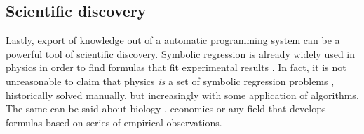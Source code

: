 \subsection{Scientific discovery}
\label{sec:scientific-discovery}

Lastly, export of knowledge out of a automatic programming system can be a powerful tool of scientific discovery. 
Symbolic regression is already widely used in physics in order to find formulas that fit experimental results \cite{angelisArtificialIntelligencePhysical2023,tenachiDeepSymbolicRegression2023}. 
In fact, it is not unreasonable to claim that physics \emph{is} a set of symbolic regression problems \cite{udrescuAIFeynmanPhysicsinspired2020}, historically solved manually, but increasingly with some application of algorithms. 
The same can be said about biology \cite{chenRevealingComplexEcological2019}, economics \cite{claveriaAssessmentEffectFinancial2017,lianModelingForecastingPassenger2018,panInfluentialFactorsCarbon2019,truscottDetectingShadowEconomy2011,truscottExplainingUnemploymentRates2014,yamashitaCustomizedPredictionAttendance2022} or any field that develops formulas based on series of empirical observations.
